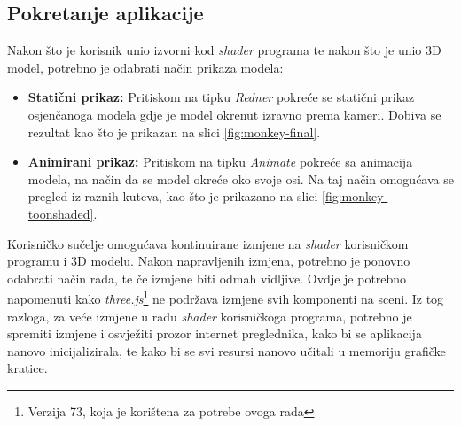 \subsection{Pokretanje aplikacije}

Nakon što je korisnik unio izvorni kod \emph{shader} programa te nakon što je unio 3D model, potrebno je odabrati način prikaza modela:

\begin{itemize}
\item \textbf{Statični prikaz:} Pritiskom na tipku \emph{Redner} pokreće se statični prikaz osjenčanoga modela gdje je model okrenut izravno prema kameri. Dobiva se rezultat kao što je prikazan na slici \ref{fig:monkey-final}.

\item \textbf{Animirani prikaz:} Pritiskom na tipku \emph{Animate} pokreće sa animacija modela, na način da se model okreće oko svoje osi. Na taj način omogućava se pregled iz raznih kuteva, kao što je prikazano na slici \ref{fig:monkey-toonshaded}.
\end{itemize}

Korisničko sučelje omogućava kontinuirane izmjene na \emph{shader} korisničkom programu i 3D modelu. Nakon napravljenih izmjena, potrebno je ponovno odabrati način rada, te če izmjene biti odmah vidljive. Ovdje je potrebno napomenuti kako \emph{three.js}\footnote{Verzija 73, koja je korištena za potrebe ovoga rada} ne podržava izmjene svih komponenti na sceni. Iz tog razloga, za veće izmjene u radu \emph{shader} korisničkoga programa, potrebno je spremiti izmjene i osvježiti prozor internet preglednika, kako bi se aplikacija nanovo inicijalizirala, te kako bi se svi resursi nanovo učitali u memoriju grafičke kratice.